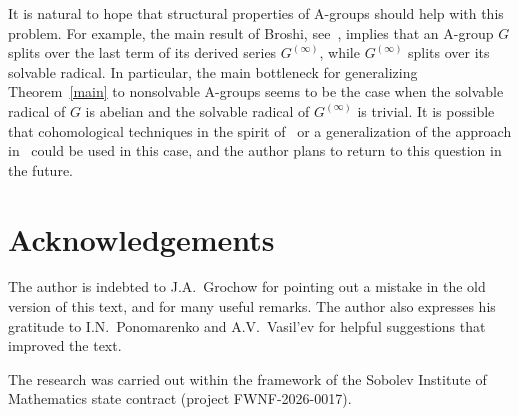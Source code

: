 \documentclass{article}
\begin{document}
It is natural to hope that structural properties of A-groups should help with this problem. For example, the main result of Broshi, see~\cite[Theorem~5.1]{broshi},
implies that an A-group \( G \) splits over the last term of its derived series \( G^{(\infty)} \), while \( G^{(\infty)} \) splits over its solvable radical.
In particular, the main bottleneck for generalizing Theorem~\ref{main} to nonsolvable A-groups seems to be the case when the solvable radical of \( G \)
is abelian and the solvable radical of \( G^{(\infty)} \) is trivial. It is possible that cohomological techniques in the spirit of~\cite{grochow}
or a generalization of the approach in~\cite{trivrad} could be used in this case, and the author plans to return to this question in the future.


\section{Acknowledgements}

The author is indebted to J.A.~Grochow for pointing out a mistake in the old version of this text, and for many useful remarks.
The author also expresses his gratitude to I.N.~Ponomarenko and A.V.~Vasil'ev for helpful suggestions that improved the text.

The research was carried out within the framework of the Sobolev Institute of Mathematics state contract (project FWNF-2026-0017).
\end{document}
